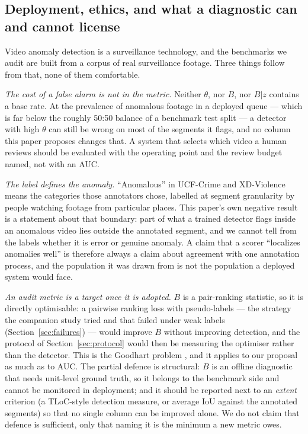 \documentclass[number,preprint,12pt]{elsarticle}
\begin{document}
\subsection{Deployment, ethics, and what a diagnostic can and cannot license}\label{sec:ethics}

Video anomaly detection is a surveillance technology, and the benchmarks we audit
are built from a corpus of real surveillance footage. Three things follow from
that, none of them comfortable.

\emph{The cost of a false alarm is not in the metric.} Neither \(\theta\), nor \(B\), nor
\(B|z\) contains a base rate. At the prevalence of anomalous footage in a deployed
queue --- which is far below the roughly 50:50 balance of a benchmark test split
--- a detector with high \(\theta\) can still be wrong on most of the segments it
flags, and no column this paper proposes changes that. A system that selects
which video a human reviews should be evaluated with the operating point and the
review budget named, not with an AUC.

\emph{The label defines the anomaly.} ``Anomalous'' in UCF-Crime and XD-Violence means
the categories those annotators chose, labelled at segment granularity by people
watching footage from particular places. This paper's own negative result is a
statement about that boundary: part of what a trained detector flags inside an
anomalous video lies outside the annotated segment, and we cannot tell from the
labels whether it is error or genuine anomaly. A claim that a scorer ``localizes
anomalies well'' is therefore always a claim about agreement with one annotation
process, and the population it was drawn from is not the population a deployed
system would face.

\emph{An audit metric is a target once it is adopted.} \(B\) is a pair-ranking
statistic, so it is directly optimisable: a pairwise ranking loss with pseudo-labels
--- the strategy the companion study tried and that failed under weak labels
(Section~\ref{sec:failures}) --- would improve \(B\) without improving detection,
and the protocol of Section~\ref{sec:protocol} would then be measuring the
optimiser rather than the detector. This is the Goodhart problem \citep{strathern1997improving}, and it applies
to our proposal as much as to AUC. The partial defence is structural: \(B\) is an
offline diagnostic that needs unit-level ground truth, so it belongs to the
benchmark side and cannot be monitored in deployment; and it should be reported
next to an \emph{extent} criterion (a TLoC-style detection measure, or average IoU
against the annotated segments) so that no single column can be improved alone.
We do not claim that defence is sufficient, only that naming it is the minimum a
new metric owes.
\end{document}
